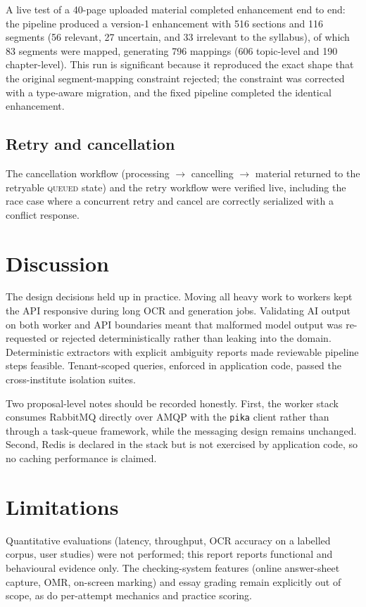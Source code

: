 A live test of a 40-page uploaded material completed enhancement end to end:
the pipeline produced a version-1 enhancement with 516 sections and 116
segments (56 relevant, 27 uncertain, and 33 irrelevant to the syllabus), of
which 83 segments were mapped, generating 796 mappings (606 topic-level and
190 chapter-level). This run is significant because it reproduced the exact
shape that the original segment-mapping constraint rejected; the constraint
was corrected with a type-aware migration, and the fixed pipeline completed
the identical enhancement.

\subsection{Retry and cancellation}

The cancellation workflow (processing $\rightarrow$ cancelling $\rightarrow$
material returned to the retryable \textsc{queued} state) and the retry
workflow were verified live, including the race case where a concurrent retry
and cancel are correctly serialized with a conflict response.

\section{Discussion}

The design decisions held up in practice. Moving all heavy work to workers
kept the API responsive during long OCR and generation jobs. Validating AI
output on both worker and API boundaries meant that malformed model output
was re-requested or rejected deterministically rather than leaking into the
domain. Deterministic extractors with explicit ambiguity reports made
reviewable pipeline steps feasible. Tenant-scoped queries, enforced in
application code, passed the cross-institute isolation suites.

Two proposal-level notes should be recorded honestly. First, the worker stack
consumes RabbitMQ directly over AMQP with the \texttt{pika} client rather than
through a task-queue framework, while the messaging design remains unchanged.
Second, Redis is declared in the stack but is not exercised by application
code, so no caching performance is claimed.

\section{Limitations}

Quantitative evaluations (latency, throughput, OCR accuracy on a labelled
corpus, user studies) were not performed; this report reports functional and
behavioural evidence only. The checking-system features (online answer-sheet
capture, OMR, on-screen marking) and essay grading remain explicitly out of
scope, as do per-attempt mechanics and practice scoring.